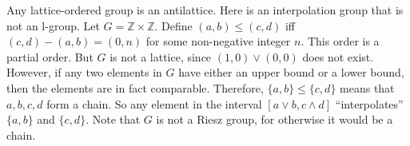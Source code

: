 \documentclass[12pt]{article}
\begin{document}
Any lattice-ordered group is an antilattice.  Here is an interpolation group that is not an l-group.  Let $G=\mathbb{Z}\times \mathbb{Z}$.  Define $(a,b)\le (c,d)$ iff $(c,d)-(a,b)=(0,n)$ for some non-negative integer $n$.  This order is a partial order.  But $G$ is not a lattice, since $(1,0)\vee (0,0)$ does not exist.  However, if any two elements in $G$ have either an upper bound or a lower bound, then the elements are in fact comparable.  Therefore, $\lbrace a,b\rbrace \le \lbrace c,d\rbrace$ means that $a,b,c,d$ form a chain.  So any element in the interval $[a\vee b,c\wedge d]$ ``interpolates'' $\lbrace a,b\rbrace$ and $\lbrace c,d\rbrace$.  Note that $G$ is not a Riesz group, for otherwise it would be a chain.
\end{document}
